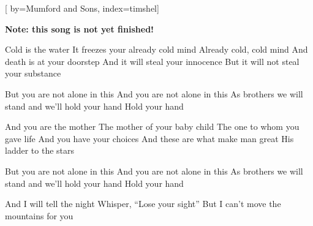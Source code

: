 

[%
    by={Mumford and Sons},
    index={timshel}]


    \label{timshel}

    \textbf{Note: this song is not yet finished!}

    \beginverse
        Cold is the water
        It freezes your already cold mind
        Already cold, cold mind
        And death is at your doorstep
        And it will steal your innocence
        But it will not steal your substance
    \endverse

    \beginchorus
        But you are not alone in this
        And you are not alone in this
        As brothers we will stand and we'll hold your hand
        Hold your hand
    \endchorus

    \beginverse
        And you are the mother
        The mother of your baby child
        The one to whom you gave life
        And you have your choices
        And these are what make man great
        His ladder to the stars
    \endverse

    \beginchorus
        But you are not alone in this
        And you are not alone in this
        As brothers we will stand and we'll hold your hand
        Hold your hand
    \endchorus

    \beginverse*
        And I will tell the night
        Whisper, ``Lose your sight''
        But I can't move the mountains for you
    \endverse
\endsong
